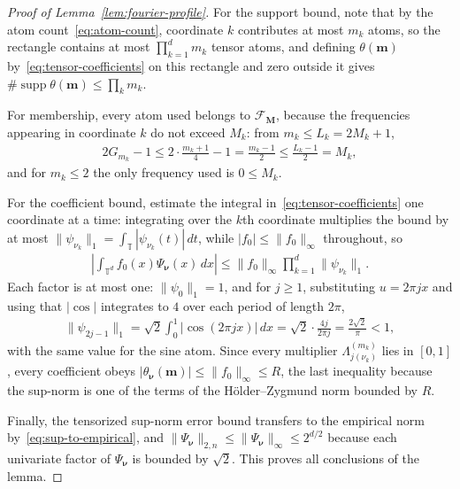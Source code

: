 \begin{proof}[Proof of Lemma~\ref{lem:fourier-profile}]
For the support bound, note that by the atom count~\eqref{eq:atom-count}, coordinate $k$ contributes at most $m_k$ atoms, so the rectangle contains at most $\prod_{k=1}^dm_k$ tensor atoms, and defining $\theta(\boldsymbol m)$ by~\eqref{eq:tensor-coefficients} on this rectangle and zero outside it gives $\#\operatorname{supp}\theta(\boldsymbol m)\leq\prod_km_k$.

For membership, every atom used belongs to $\mathcal F_{\boldsymbol M}$, because the frequencies appearing in coordinate $k$ do not exceed $M_k$: from $m_k\leq L_k=2M_k+1$,
\begin{align*}
2G_{m_k}-1\leq2\cdot\frac{m_k+1}{4}-1=\frac{m_k-1}{2}\leq\frac{L_k-1}{2}=M_k,
\end{align*}
and for $m_k\leq2$ the only frequency used is $0\leq M_k$.

For the coefficient bound, estimate the integral in~\eqref{eq:tensor-coefficients} one coordinate at a time: integrating over the $k$th coordinate multiplies the bound by at most $\|\psi_{\nu_k}\|_1=\int_{\mathbb T}|\psi_{\nu_k}(t)|\,dt$, while $|f_0|\leq\|f_0\|_\infty$ throughout, so
\begin{align*}
\left|\int_{\mathbb T^d}f_0(x)\Psi_{\boldsymbol\nu}(x)\,dx\right|
\leq\|f_0\|_\infty\prod_{k=1}^d\|\psi_{\nu_k}\|_1 .
\end{align*}
Each factor is at most one: $\|\psi_0\|_1=1$, and for $j\geq1$, substituting $u=2\pi jx$ and using that $|\cos|$ integrates to $4$ over each period of length $2\pi$,
\begin{align*}
\|\psi_{2j-1}\|_1
=\sqrt2\int_0^1|\cos(2\pi jx)|\,dx
=\sqrt2\cdot\frac{4j}{2\pi j}
=\frac{2\sqrt2}{\pi}<1,
\end{align*}
with the same value for the sine atom. Since every multiplier $\Lambda^{(m_k)}_{j(\nu_k)}$ lies in $[0,1]$, every coefficient obeys $|\theta_{\boldsymbol\nu}(\boldsymbol m)|\leq\|f_0\|_\infty\leq R$, the last inequality because the sup-norm is one of the terms of the H\"older--Zygmund norm bounded by $R$.

Finally, the tensorized sup-norm error bound transfers to the empirical norm by~\eqref{eq:sup-to-empirical}, and $\|\Psi_{\boldsymbol\nu}\|_{2,n}\leq\|\Psi_{\boldsymbol\nu}\|_\infty\leq2^{d/2}$ because each univariate factor of $\Psi_{\boldsymbol\nu}$ is bounded by $\sqrt2$. This proves all conclusions of the lemma.
\end{proof}

